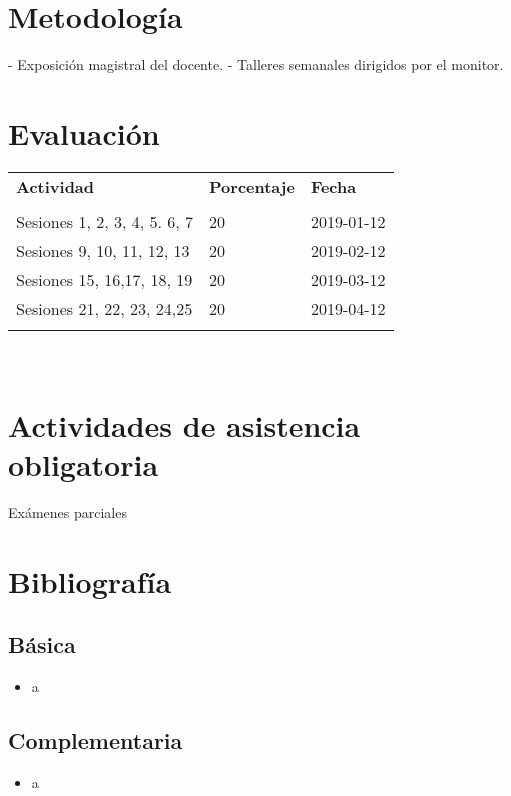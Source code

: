 \documentclass[11pt]{article}
\begin{document}
\section*{Metodología}

- Exposición magistral del docente. - Talleres semanales dirigidos por el monitor.

\section*{Evaluación}
\noindent \begin{tabular}{R{0.5\textwidth} C{0.2\textwidth} C{0.2\textwidth}}
	\toprule
	\textbf{Actividad} & \textbf{Porcentaje} & \textbf{Fecha} \\
	\\
	\midrule
	Sesiones 1, 2, 3, 4, 5. 6, 7 & 20 & 2019-01-12 \\ Sesiones 9, 10, 11, 12, 13 & 20 & 2019-02-12 \\ Sesiones 15, 16,17, 18, 19 & 20 & 2019-03-12 \\ Sesiones 21, 22, 23, 24,25 & 20 & 2019-04-12 \\ 
	\\
	\midrule
\end{tabular}
\\
\section*{Actividades de asistencia obligatoria}

Exámenes parciales

\section*{Bibliografía}

\subsection*{Básica}

\begin{itemize}
\item a 
\end{itemize}

\subsection*{Complementaria}

\begin{itemize}
\item a 
\end{itemize}
\end{document}
